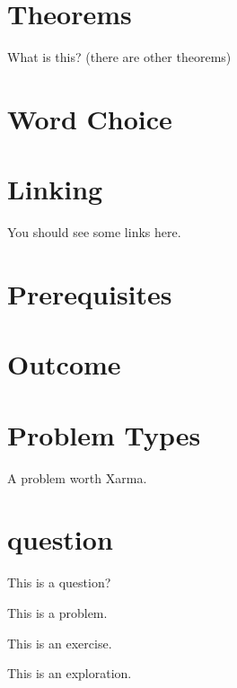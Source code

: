 \documentclass{ximera}
\begin{document}
\section{Theorems}

\begin{theorem}
What is this? (there are other theorems)
\end{theorem}



\section{Word Choice}



\section{Linking}

You should see some links here.

\link{}



\section{Prerequisites}




\section{Outcome}




\section{Problem Types}

\begin{xarmaBoost}
A problem worth Xarma.
\end{xarmaBoost}

\section{question}

\begin{question}
This is a question?
\end{question}

\begin{problem}
This is a problem.
\end{problem}

\begin{exercise}
This is an exercise.
\end{exercise}

\begin{exploration}
This is an exploration.
\end{exploration}
\end{document}
